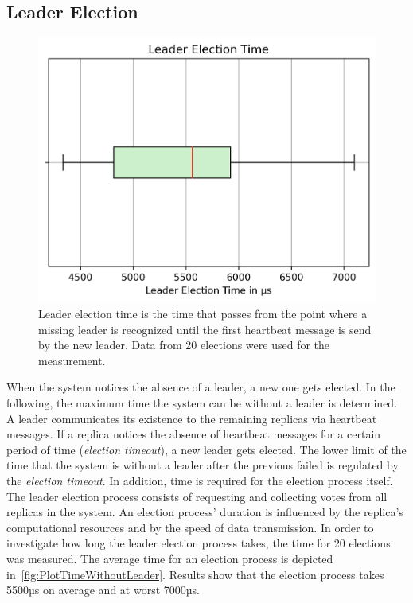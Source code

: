 \subsection{Leader Election}
\begin{figure}[!hb]
	\centering
	\includegraphics[width=0.8\linewidth]{images/plots/timeWithoutLeader}
	\caption{Leader election time is the time that passes from the point where a missing leader is recognized until the first heartbeat message is send by the new leader. Data from 20 elections were used for the measurement.}
	\label{fig:PlotTimeWithoutLeader}
\end{figure}

When the system notices the absence of a leader, a new one gets elected.
In the following, the maximum time the system can be without a leader is determined.
\\

A leader communicates its existence to the remaining replicas via heartbeat messages.
If a replica notices the absence of heartbeat messages for a certain period of time (\textit{election timeout}), a new leader gets elected.
The lower limit of the time that the system is without a leader after the previous failed is regulated by the \textit{election timeout}.
In addition, time is required for the election process itself.
The leader election process consists of requesting and collecting votes from all replicas in the system.
An election process' duration is influenced by the replica's computational resources and by the speed of data transmission.
In order to investigate how long the leader election process takes, the time for 20 elections was measured.
The average time for an election process is depicted in~\autoref{fig:PlotTimeWithoutLeader}.
Results show that the election process takes 5500µs on average and at worst 7000µs.
\\

